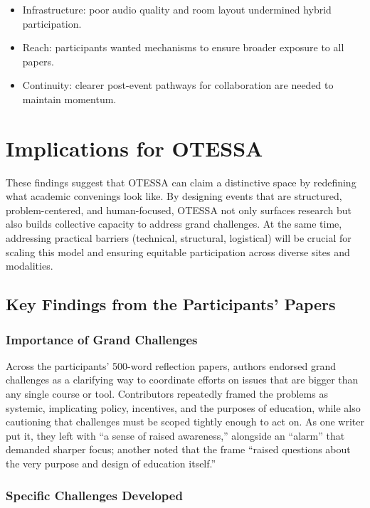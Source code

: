 \documentclass[
  letterpaper,
  DIV=11,
  numbers=noendperiod]{scrartcl}
\begin{document}
\begin{itemize}
\item
  Infrastructure: poor audio quality and room layout undermined hybrid
  participation.
\item
  Reach: participants wanted mechanisms to ensure broader exposure to
  all papers.
\item
  Continuity: clearer post-event pathways for collaboration are needed
  to maintain momentum.
\end{itemize}

\section{Implications for OTESSA}\label{implications-for-otessa}

These findings suggest that OTESSA can claim a distinctive space by
redefining what academic convenings look like. By designing events that
are structured, problem-centered, and human-focused, OTESSA not only
surfaces research but also builds collective capacity to address grand
challenges. At the same time, addressing practical barriers (technical,
structural, logistical) will be crucial for scaling this model and
ensuring equitable participation across diverse sites and modalities.

\subsection{Key Findings from the Participants'
Papers}\label{key-findings-from-the-participants-papers}

\subsubsection{Importance of Grand
Challenges}\label{importance-of-grand-challenges}

Across the participants' 500-word reflection papers, authors endorsed
grand challenges as a clarifying way to coordinate efforts on issues
that are bigger than any single course or tool. Contributors repeatedly
framed the problems as systemic, implicating policy, incentives, and the
purposes of education, while also cautioning that challenges must be
scoped tightly enough to act on. As one writer put it, they left with
``a sense of raised awareness,'' alongside an ``alarm'' that demanded
sharper focus; another noted that the frame ``raised questions about the
very purpose and design of education itself.''

\subsubsection{Specific Challenges
Developed}\label{specific-challenges-developed}
\end{document}
